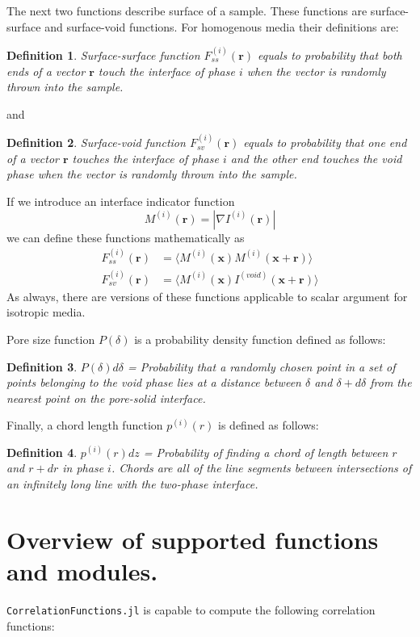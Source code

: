 \documentclass[reprint,amsmath,amssymb,aps,pre,showkeys,showpacs,nofootinbib]{revtex4-1}
\newtheorem{definition}{Definition}
\begin{document}
The next two functions describe surface of a sample. These functions are
surface-surface and surface-void functions. For homogenous media their
definitions are:
\begin{definition}
  Surface-surface function $F_{ss}^{(i)}(\mathbf{r})$ equals to probability that
  both ends of a vector $\mathbf{r}$ touch the interface of phase $i$ when the
  vector is randomly thrown into the sample.
\end{definition}
and
\begin{definition}
  Surface-void function $F_{sv}^{(i)}(\mathbf{r})$ equals to probability that
  one end of a vector $\mathbf{r}$ touches the interface of phase $i$ and the
  other end touches the void phase when the vector is randomly thrown into the
  sample.
\end{definition}
If we introduce an interface indicator function
\begin{equation*}
  M^{(i)}(\mathbf{r}) = | \nabla I^{(i)}(\mathbf{r}) |
\end{equation*}
we can define these functions mathematically as
\begin{align}
  F_{ss}^{(i)}(\mathbf{r}) &= \langle M^{(i)}(\mathbf{x}) M^{(i)}(\mathbf{x} +
  \mathbf{r}) \rangle \label{eq:fss-def} \\ 
  F_{sv}^{(i)}(\mathbf{r}) &= \langle M^{(i)}(\mathbf{x}) I^{(void)}(\mathbf{x}
  + \mathbf{r}) \rangle \label{eq:fsv-def}
\end{align}
As always, there are versions of these functions applicable to scalar argument
for isotropic media.

Pore size function $P(\delta)$ is a probability density function defined as
follows:
\begin{definition}
  $P(\delta)d\delta$ = Probability that a randomly chosen point in a set of points
  belonging to the void phase lies at a distance between $\delta$ and $\delta + d\delta$
  from the nearest point on the pore-solid interface.
\end{definition}

Finally, a chord length function $p^{(i)}(r)$ is defined as follows:
\begin{definition}
$p^{(i)}(r)dz$ = Probability of finding a chord of length between $r$ and $r+dr$
in phase $i$. Chords are all of the line segments between intersections of an
infinitely long line with the two-phase interface.
\end{definition}


\section{Overview of supported functions and modules.}
\label{sec:overview}
\verb+CorrelationFunctions.jl+ is capable to compute the following correlation
functions:
\end{document}
